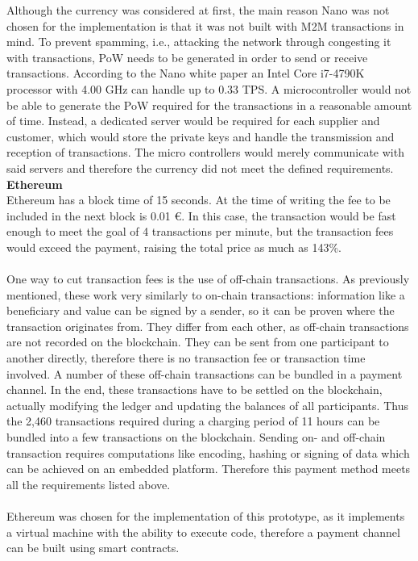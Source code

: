 Although the currency was considered at first, the main reason Nano was not chosen for the implementation is that it was not built with M2M transactions in mind.
To prevent spamming, i.e., attacking the network through congesting it with transactions, PoW needs to be generated in order to send or receive transactions.
According to the Nano white paper\cite{nano-white-paper} an Intel Core i7-4790K processor with 4.00 GHz can handle up to 0.33 TPS.
A microcontroller would not be able to generate the PoW required for the transactions in a reasonable amount of time.
Instead, a dedicated server would be required for each supplier and customer, which would store the private keys and handle the transmission and reception of transactions.
The micro controllers would merely communicate with said servers and therefore the currency did not meet the defined requirements.
\newpage
\textbf{Ethereum}\\
Ethereum has a block time of 15 seconds.
At the time of writing the fee to be included in the next block is 0.01 \euro\cite{ethereum-fee}.
In this case, the transaction would be fast enough to meet the goal of 4 transactions per minute, but the transaction fees would exceed the payment, raising the total price as much as 143\%.
\\\\
One way to cut transaction fees is the use of off-chain transactions.
As previously mentioned, these work very similarly to on-chain transactions: information like a beneficiary and value can be signed by a sender, so it can be proven where the transaction originates from.
They differ from each other, as off-chain transactions are not recorded on the blockchain.
They can be sent from one participant to another directly, therefore there is no transaction fee or transaction time involved.
A number of these off-chain transactions can be bundled in a payment channel.
In the end, these transactions have to be settled on the blockchain, actually modifying the ledger and updating the balances of all participants.
Thus the 2,460 transactions required during a charging period of 11 hours can be bundled into a few transactions on the blockchain.
Sending on- and off-chain transaction requires computations like encoding, hashing or signing of data which can be achieved on an embedded platform.
Therefore this payment method meets all the requirements listed above.
\\\\
Ethereum was chosen for the implementation of this prototype, as it implements a virtual machine with the ability to execute code, therefore a payment channel can be built using smart contracts.
